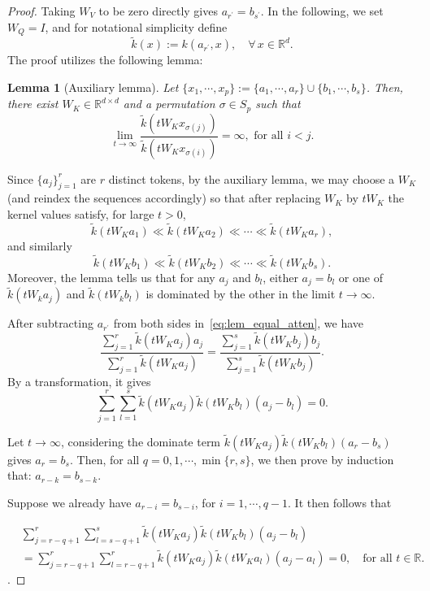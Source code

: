 \documentclass{article}
\newtheorem{lemma}{Lemma}
\begin{document}
\begin{proof}
    Taking $W_V$ to be zero directly gives $a_{r^\prime}=b_{s^\prime}$. In the following, we set $W_Q=I$, and for notational simplicity define
    \[
    \tilde k(x):=k(a_{r^\prime},x),\quad \forall\,x\in\mathbb{R}^d.
    \]
     The proof utilizes the following lemma:
\begin{lemma}[Auxiliary lemma]
    \label{lem:lemma_aux}
    Let $\{x_1,\cdots, x_p\}:=\{a_1,\cdots, a_r\}\cup \{b_1,\cdots, b_s\}$. Then, there exist $W_K\in\mathbb{R}^{d\times d}$ and a permutation $\sigma\in S_p$ such that
    \begin{equation}
        \lim_{t\to\infty} \frac{\tilde k(tW_K x_{\sigma(j)})}{\tilde k(tW_K x_{\sigma(i)})}=\infty, \text{ for all } i<j.
    \end{equation}
\end{lemma}

Since $\{a_j\}_{j=1}^r$ are $r$ distinct tokens, by the auxiliary lemma, we may choose a $W_K$ (and reindex the sequences accordingly) so that after replacing $W_K$ by $tW_K$ the kernel values satisfy, for large $t>0$,
\[
\tilde k(tW_Ka_1)\ll \tilde k(tW_Ka_2)\ll\cdots\ll \tilde k(tW_Ka_r),
\]
and similarly
\[
\tilde k(tW_Kb_1)\ll \tilde k(tW_Kb_2)\ll\cdots\ll \tilde k(tW_Kb_s).
\]
Moreover, the lemma tells us that for any $a_j$ and $b_l$, either $a_j=b_l$ or one of $\tilde k(tW_ka_j)$ and $\tilde k(tW_kb_l)$ is dominated by the other in the limit $t\to\infty$.


After subtracting $a_{r^\prime}$ from both sides in~\eqref{eq:lem_equal_atten}, we have
\begin{equation}
    \label{eq:mean_eq}
    \frac{\sum_{j=1}^r \tilde k(tW_Ka_j)a_j}{\sum_{j=1}^r \tilde k(tW_Ka_j)}
    = \frac{\sum_{j=1}^s \tilde k(tW_Kb_j)b_j}{\sum_{j=1}^s \tilde k(tW_Kb_j)}.
\end{equation}
By a transformation, it gives
\begin{equation}
    \label{eq:mean_eq2}
\sum_{j=1}^r\sum_{l=1}^s \tilde k(tW_Ka_j)\tilde k(tW_Kb_l)(a_j-b_l)=0.
\end{equation}

Let $t\to \infty$, considering the dominate term $\tilde k(tW_Ka_j)\tilde k(tW_Kb_l)(a_r-b_s)$ gives $a_r=b_s$. Then, for all $q=0, 1,\cdots, \min\{r,s\}$, we then prove by induction that: $a_{r-k}=b_{s-k}$.

Suppose we already have $a_{r-i}=b_{s-i}$, for $i=1,\cdots, q-1$. It then follows that

\begin{equation}
        \label{eq:lem_sum_exp_zero}
        \begin{aligned}
                        &\sum_{j=r-q+1}^r\sum_{l=s-q+1}^s \tilde k(tW_Ka_j)\tilde k(tW_Kb_l)(a_j-b_l)\\
                        &=\sum_{j=r-q+1}^r\sum_{l=r-q+1}^r \tilde k(tW_Ka_j)\tilde k(tW_Ka_l)(a_j-a_l)=0, \quad \text{for all }t\in\mathbb R.
        \end{aligned}
\end{equation}.


\end{proof}
\end{document}
